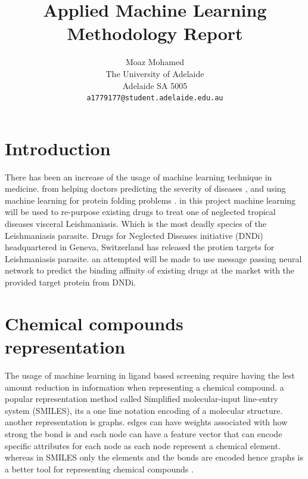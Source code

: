 \documentclass[10pt,twocolumn,letterpaper]{article}
\begin{document}
\title{Applied Machine Learning Methodology Report}

\author{Moaz Mohamed\\
The University of Adelaide\\
Adelaide SA 5005\\
{\tt\small a1779177@student.adelaide.edu.au}
}

\maketitle


\section{Introduction}

There has been an increase of the usage of machine learning technique in medicine. from helping doctors predicting the severity of diseases \cite{Yao2020}, and using machine learning for protein folding problems \cite{Noe2020}. in this project machine learning will be used to re-purpose existing drugs to treat one of neglected tropical diseases visceral Leishmaniasis. Which is the most deadly species of the Leishmaniasis parasite. Drugs for Neglected Diseases initiative (DNDi) headquartered in Geneva, Switzerland has released the protien targets for Leishmaniasis parasite. an attempted will be made to use message passing neural network to predict the binding affinity \cite{Feinberg2018} of existing drugs at the market with the provided target protein from DNDi.

\section{Chemical compounds representation}
The usage of machine learning in ligand based screening require having the lest amount reduction in information when representing a chemical compound. a popular representation method called Simplified molecular-input line-entry system (SMILES), its a one line notation encoding of a molecular structure. another representation is graphs. edges can have weights associated with how strong the bond is and each node can have a feature vector that can encode specific attributes for each node as each node represent a chemical element. whereas in SMILES only the elements and the bonds are encoded hence graphs is a better tool for representing chemical compounds \cite{Toropov2011}. 
\end{document}
